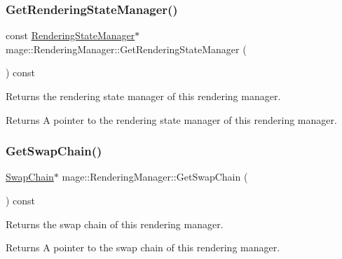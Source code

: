 \subsubsection{\texorpdfstring{Get\+Rendering\+State\+Manager()}{GetRenderingStateManager()}}
{\footnotesize\ttfamily const \hyperlink{classmage_1_1_rendering_state_manager}{Rendering\+State\+Manager}$\ast$ mage\+::\+Rendering\+Manager\+::\+Get\+Rendering\+State\+Manager (\begin{DoxyParamCaption}{ }\end{DoxyParamCaption}) const\hspace{0.3cm}{\ttfamily [noexcept]}}

Returns the rendering state manager of this rendering manager.

\begin{DoxyReturn}{Returns}
A pointer to the rendering state manager of this rendering manager. 
\end{DoxyReturn}
\hypertarget{classmage_1_1_rendering_manager_a867d9d3986a38c98562cf0cfe9797fe0}{}\label{classmage_1_1_rendering_manager_a867d9d3986a38c98562cf0cfe9797fe0} 
\subsubsection{\texorpdfstring{Get\+Swap\+Chain()}{GetSwapChain()}}
{\footnotesize\ttfamily \hyperlink{classmage_1_1_swap_chain}{Swap\+Chain}$\ast$ mage\+::\+Rendering\+Manager\+::\+Get\+Swap\+Chain (\begin{DoxyParamCaption}{ }\end{DoxyParamCaption}) const\hspace{0.3cm}{\ttfamily [noexcept]}}

Returns the swap chain of this rendering manager.

\begin{DoxyReturn}{Returns}
A pointer to the swap chain of this rendering manager. 
\end{DoxyReturn}
\hypertarget{classmage_1_1_rendering_manager_a80812ecd5c9757b961e46e6bb7533566}{}\label{classmage_1_1_rendering_manager_a80812ecd5c9757b961e46e6bb7533566} 
